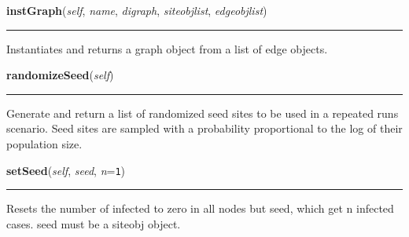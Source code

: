     \vspace{0.5ex}

    \begin{boxedminipage}{\textwidth}

    \raggedright \textbf{instGraph}(\textit{self}, \textit{name}, \textit{digraph}, \textit{siteobjlist}, \textit{edgeobjlist})

    \vspace{-1.5ex}

    \rule{\textwidth}{0.5\fboxrule}
    Instantiates and returns a graph object from a list of edge objects.

    \vspace{1ex}

    \end{boxedminipage}

    \label{Epigrass:manager:simulate:randomizeSeed}

    \vspace{0.5ex}

    \begin{boxedminipage}{\textwidth}

    \raggedright \textbf{randomizeSeed}(\textit{self})

    \vspace{-1.5ex}

    \rule{\textwidth}{0.5\fboxrule}
    Generate and return a list of randomized seed sites to be used in a 
    repeated runs scenario. Seed sites are sampled with a probability 
    proportional to the log of their population size.

    \vspace{1ex}

    \end{boxedminipage}

    \label{Epigrass:manager:simulate:setSeed}

    \vspace{0.5ex}

    \begin{boxedminipage}{\textwidth}

    \raggedright \textbf{setSeed}(\textit{self}, \textit{seed}, \textit{n}=\texttt{1})

    \vspace{-1.5ex}

    \rule{\textwidth}{0.5\fboxrule}
    Resets the number of infected to zero in all nodes but seed, which get 
    n infected cases. seed must be a siteobj object.

    \vspace{1ex}

    \end{boxedminipage}

